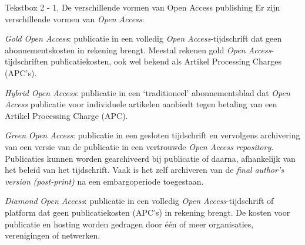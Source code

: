 \documentclass[smallauthor, chapterhaspagenum, nochapterinheader, pagenuminheader,  bigchapnum,medium2, tocpages,  garamond, titleinheader]{jote-book}
\begin{document}
	\begin{bookbox}{Tekstbox 2 - 1. De verschillende vormen van Open Access publishing}
		Er zijn verschillende vormen van \emph{Open Access}:

		\vspace*{\baselineskip}

		\emph{Gold }\emph{Open Access}: publicatie in een volledig \emph{Open Access}-tijdschrift dat geen abonnementskosten in rekening brengt. Meestal rekenen gold \emph{Open Access}-tijdschriften publicatiekosten, ook wel bekend als Artikel Processing Charges (APC's).

		\vspace*{\baselineskip}

		\emph{Hybrid}\emph{ }\emph{Open Access}: publicatie in een ‘traditioneel' abonnementsblad dat \emph{Open Access} publicatie voor individuele artikelen aanbiedt tegen betaling van een Artikel Processing Charge (APC).

		\vspace*{\baselineskip}

		\emph{Green }\emph{Open Access}: publicatie in een gesloten tijdschrift en vervolgens archivering van een versie van de publicatie in een vertrouwde \emph{Open Access} \emph{repository}. Publicaties kunnen worden gearchiveerd bij publicatie of daarna, afhankelijk van het beleid van het tijdschrift. Vaak is het zelf archiveren van de\emph{ }\emph{final}\emph{ }\emph{author's}\emph{ }\emph{version}\emph{ (post-print}\emph{)} na een embargoperiode toegestaan.

		\vspace*{\baselineskip}

		\emph{Diamond}\emph{ }\emph{Open Access}: publicatie in een volledig \emph{Open Access}-tijdschrift of platform dat geen publicatiekosten (APC's) in rekening brengt. De kosten voor publicatie en hosting worden gedragen door één of meer organisaties, verenigingen of netwerken.
	\end{bookbox}
\end{document}
